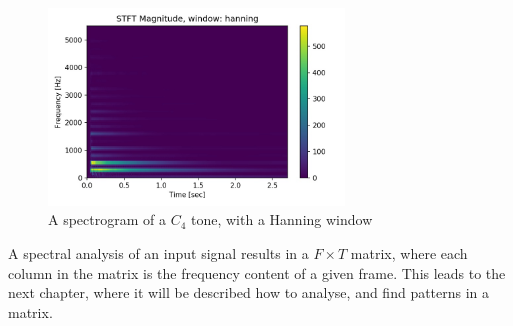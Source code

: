 \begin{figure}[H]
    \centering
    \includegraphics[width=0.7\textwidth]{figures/spectrogramC4hanning.jpg}
    \caption{A spectrogram of a $C_4$ tone, with a Hanning window }
    \label{fig: spectrogram_of_C4}
\end{figure}

A spectral analysis of an input signal results in a $F \times T$ matrix, where each column in the matrix is the frequency content of a given frame. This leads to the next chapter, where it will be described how to analyse, and find patterns in a matrix. 